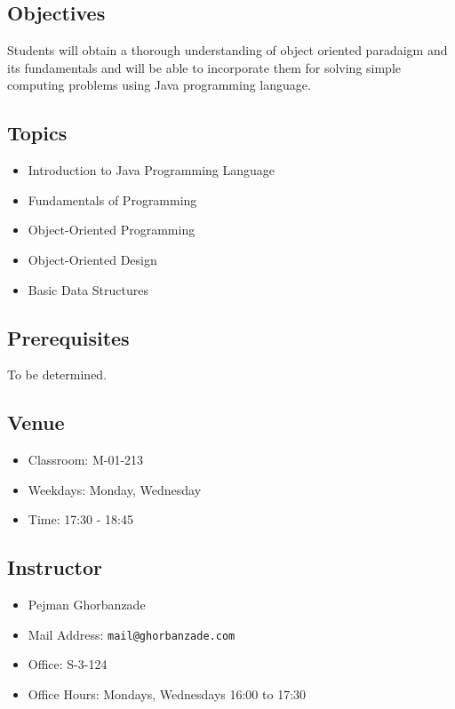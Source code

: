 \documentclass[12pt,letterpaper,twoside]{article}
\begin{document}


\subsection*{Objectives}
Students will obtain a thorough understanding of object oriented paradaigm and its fundamentals and will be able to incorporate them for solving simple computing problems using Java programming language.

\subsection*{Topics}
\begin{itemize}
\item[] Introduction to Java Programming Language
\item[] Fundamentals of Programming
\item[] Object-Oriented Programming
\item[] Object-Oriented Design
\item[] Basic Data Structures
\end{itemize}

\subsection*{Prerequisites}
To be determined.

\subsection*{Venue}
\begin{itemize}
\item[] Classroom: M-01-213
\item[] Weekdays: Monday, Wednesday
\item[] Time: 17:30 - 18:45
\end{itemize}

\subsection*{Instructor}
\begin{itemize}
\item[] Pejman Ghorbanzade
\item[] Mail Address: \texttt{mail@ghorbanzade.com}
\item[] Office: S-3-124
\item[] Office Hours: Mondays, Wednesdays 16:00 to 17:30
\end{itemize}
\end{document}
